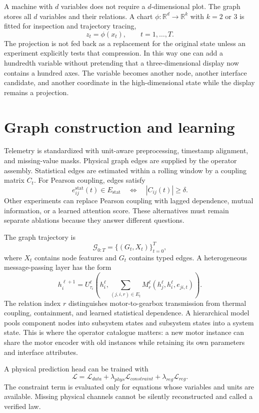 \documentclass[11pt]{article}
\begin{document}
A machine with $d$ variables does not require a $d$-dimensional plot. The graph stores all $d$ variables and their relations. A chart $\phi:\mathbb{R}^{d}\rightarrow\mathbb{R}^{k}$ with $k=2$ or $3$ is fitted for inspection and trajectory tracing,
\[
 z_t=\phi(x_t),\qquad t=1,\ldots,T.
\]
The projection is not fed back as a replacement for the original state unless an experiment explicitly tests that compression. In this way one can add a hundredth variable without pretending that a three-dimensional display now contains a hundred axes. The variable becomes another node, another interface candidate, and another coordinate in the high-dimensional state while the display remains a projection.

\section{Graph construction and learning}

Telemetry is standardized with unit-aware preprocessing, timestamp alignment, and missing-value masks. Physical graph edges are supplied by the operator assembly. Statistical edges are estimated within a rolling window by a coupling matrix $C_t$. For Pearson coupling, edges satisfy
\[
 e_{ij}^{\mathrm{stat}}(t)\in E_{\mathrm{stat}}\quad\Longleftrightarrow\quad |C_{ij}(t)|\geq\delta.
\]
Other experiments can replace Pearson coupling with lagged dependence, mutual information, or a learned attention score. These alternatives must remain separate ablations because they answer different questions.

The graph trajectory is
\[
\mathcal{G}_{0:T}=\{(G_t,X_t)\}_{t=0}^{T},
\]
where $X_t$ contains node features and $G_t$ contains typed edges. A heterogeneous message-passing layer has the form
\[
h_i^{\ell+1}=U_{\tau_i}^{\ell}\left(h_i^\ell,\sum_{(j,i,r)\in E_t}M_{r}^{\ell}(h_j^\ell,h_i^\ell,e_{ji,t})\right).
\]
The relation index $r$ distinguishes motor-to-gearbox transmission from thermal coupling, containment, and learned statistical dependence. A hierarchical model pools component nodes into subsystem states and subsystem states into a system state. This is where the operator catalogue matters: a new motor instance can share the motor encoder with old instances while retaining its own parameters and interface attributes.

A physical prediction head can be trained with
\[
\mathcal{L}=\mathcal{L}_{data}+\lambda_{phys}\mathcal{L}_{constraint}+\lambda_{reg}\mathcal{L}_{reg}.
\]
The constraint term is evaluated only for equations whose variables and units are available. Missing physical channels cannot be silently reconstructed and called a verified law.
\end{document}
